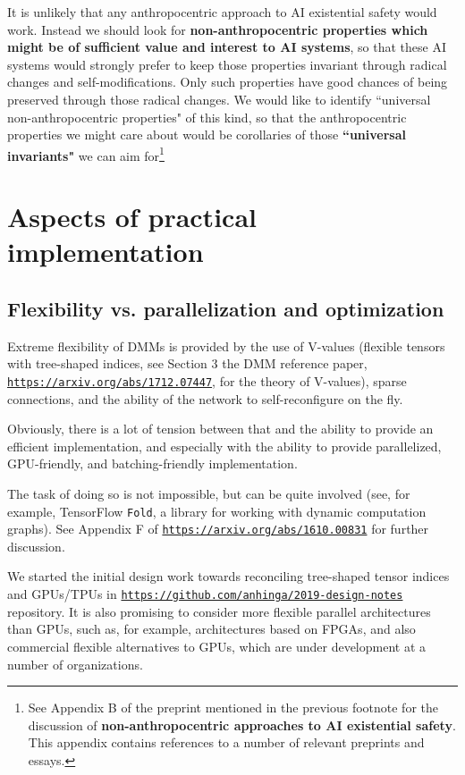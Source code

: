 \documentclass{article}
\begin{document}
It is unlikely that any anthropocentric approach to AI existential safety would work.
Instead we should look for {\bf non-anthropocentric properties which might be of sufficient value and interest to AI systems},
so that these AI systems would strongly prefer to keep those properties invariant through radical changes and self-modifications.
Only such properties have good chances of being preserved through those radical changes.
We would like to identify ``universal non-anthropocentric properties" of this kind, so that the anthropocentric properties we might
care about would be corollaries of those {\bf ``universal invariants"} we can aim for\footnote{See
Appendix B of the preprint mentioned in the previous footnote 
for the discussion of {\bf non-anthropocentric approaches to AI existential safety}. This appendix contains references to a number
of relevant preprints and essays.} 
 


\section{Aspects of practical implementation}

\subsection{Flexibility vs. parallelization and optimization} 

Extreme flexibility of DMMs is provided by the use of V-values (flexible tensors with tree-shaped indices, 
see Section 3 the DMM reference paper, \href{https://arxiv.org/abs/1712.07447}{\tt https://arxiv.org/abs/1712.07447}, for
the theory of V-values),
sparse connections, and the ability of the network to self-reconfigure on the fly.

Obviously, there is a lot of tension between that and the ability to provide an efficient implementation,
and especially with the ability to provide parallelized, GPU-friendly, and batching-friendly implementation.

The task of doing so is not impossible, but can be quite involved (see, for example, TensorFlow {\tt Fold},
a library for working with dynamic computation graphs). See Appendix F of \href{https://arxiv.org/abs/1610.00831}{\tt https://arxiv.org/abs/1610.00831} for further discussion.

We started the initial design work towards reconciling tree-shaped tensor indices and GPUs/TPUs in
\href{https://github.com/anhinga/2019-design-notes}{\tt https://github.com/anhinga/2019-design-notes}
repository. It is also promising to consider more flexible parallel architectures than GPUs, such
as, for example, architectures based on FPGAs, and also commercial flexible alternatives to GPUs,
which are under development at a number of organizations. 
\end{document}
